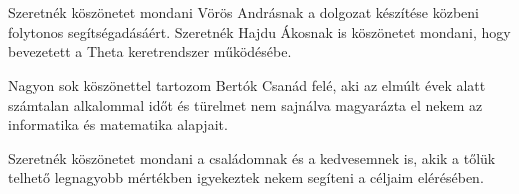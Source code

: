 \chapter*{\koszonetnyilvanitas}

Szeretnék köszönetet mondani Vörös Andrásnak a dolgozat készítése közbeni folytonos segítségadásáért. Szeretnék Hajdu Ákosnak is köszönetet mondani, hogy bevezetett a Theta keretrendszer működésébe. 

Nagyon sok köszönettel tartozom Bertók Csanád felé, aki az elmúlt évek alatt számtalan alkalommal időt és türelmet nem sajnálva magyarázta el nekem az informatika és matematika alapjait. 

Szeretnék köszönetet mondani a családomnak és a kedvesemnek is, akik a tőlük telhető legnagyobb mértékben igyekeztek nekem segíteni a céljaim elérésében.